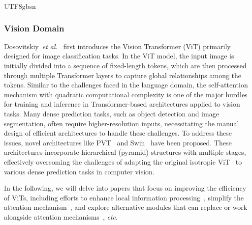 \documentclass[10pt,journal,compsoc]{IEEEtran}
\newcommand{\etal}{\emph{et al.}}
\newcommand{\etc}{\emph{etc}}
\newcommand{\<}{\left\langle}
\renewcommand{\>}{\right\rangle}
\newcommand{\1}{\mathbbm{1}}
\begin{document}
\begin{CJK}{UTF8}{gbsn}
\begin{table}[t]
\end{table}



\subsubsection{Vision Domain}
Dosovitskiy~\etal~\cite{dosovitskiy2020image} first introduces the Vision Transformer (ViT) primarily designed for image classification tasks. In the ViT model, the input image is initially divided into a sequence of fixed-length tokens, which are then processed through multiple Transformer layers to capture global relationships among the tokens.
Similar to the challenges faced in the language domain, the self-attention mechanism with quadratic computational complexity is one of the major hurdles for training and inference in Transformer-based architectures applied to vision tasks. Many dense prediction tasks, such as object detection and image segmentation, often require higher-resolution inputs, necessitating the manual design of efficient architectures to handle these challenges.
To address these issues, novel architectures like PVT~\cite{wang2021pyramid} and Swin~\cite{wang2021pyramid} have been proposed. These architectures incorporate hierarchical (pyramid) structures with multiple stages, effectively overcoming the challenges of adapting the original isotropic ViT~\cite{dosovitskiy2020image} to various dense prediction tasks in computer vision.

In the following, we will delve into papers that focus on improving the efficiency of ViTs, including efforts to enhance local information processing~\cite{guo2022cmt,heo2021rethinking,yang2021focal,tang2022quadtree,pan2021scalable,chen2021crossvit,xu2021co}, simplify the attention mechanism~\cite{parmar2018image,hatamizadeh2023fastervit,liu2023efficientvit,you2022castling,xiong2021nystromformer}, and explore alternative modules that can replace or work alongside attention mechanisms~\cite{guo2022beyond,yu2022metaformer,wang2023riformer,lian2021mlp,chen2021cyclemlp}, \etc.


\end{CJK}
\end{document}
